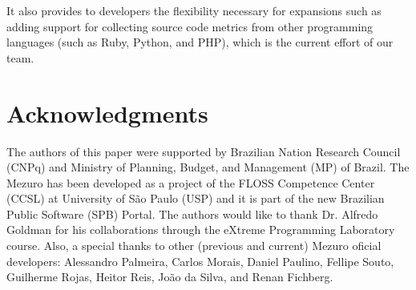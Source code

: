 It also provides to developers the flexibility necessary for expansions such as
adding support for collecting source code metrics from other programming
languages (such as Ruby, Python, and PHP), which is the current effort of our team.


\section*{Acknowledgments}

{\footnotesize The authors of this paper were supported by Brazilian Nation Research Council
(CNPq) and Ministry of Planning, Budget, and Management (MP) of Brazil.
%
The Mezuro has been developed as a project of the FLOSS Competence Center
(CCSL) at University of São Paulo (USP) and it is part of the new Brazilian
Public Software (SPB) Portal.
%
The authors would like to thank Dr. Alfredo Goldman for his collaborations
through the eXtreme Programming Laboratory course.
%
Also, a special thanks to other (previous and current) Mezuro oficial developers:
Alessandro Palmeira,
Carlos Morais,
Daniel Paulino,
Fellipe Souto,
Guilherme Rojas,
Heitor Reis,
João da Silva, and
Renan Fichberg.}

